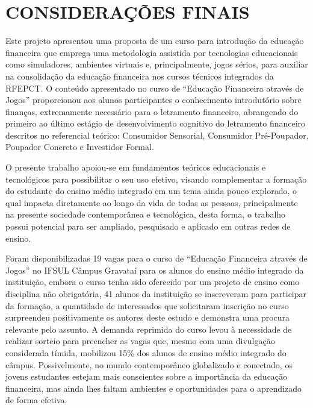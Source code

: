 \chapter{CONSIDERAÇÕES FINAIS}
Este projeto apresentou uma proposta de um curso para introdução da educação financeira que emprega uma metodologia assistida por tecnologias educacionais como simuladores, ambientes virtuais e, principalmente, jogos sérios, para auxiliar na consolidação da educação financeira nos cursos técnicos integrados da RFEPCT. O conteúdo apresentado no curso de “Educação Financeira através de Jogos” proporcionou aos alunos participantes o conhecimento introdutório sobre finanças, extremamente necessário para o letramento financeiro, abrangendo do primeiro ao último estágio de desenvolvimento cognitivo do letramento financeiro descritos no referencial teórico: Consumidor Sensorial, Consumidor Pré-Poupador, Poupador Concreto e Investidor Formal.

O presente trabalho apoiou-se em fundamentos teóricos educacionais e tecnológicos para possibilitar o seu uso efetivo, visando complementar a formação do estudante do ensino médio integrado em um tema ainda pouco explorado, o qual impacta diretamente ao longo da vida de todas as pessoas, principalmente na presente sociedade contemporânea e tecnológica, desta forma, o trabalho possui potencial para ser ampliado, pesquisado e aplicado em outras redes de ensino.

Foram disponibilizadas 19 vagas para o curso de “Educação Financeira através de Jogos” no IFSUL Câmpus Gravataí para os alunos do ensino médio integrado da instituição, embora o curso tenha sido oferecido por um projeto de ensino como disciplina não obrigatória, 41 alunos da instituição se inscreveram para participar da formação, a quantidade de interessados que solicitaram inscrição no curso surpreendeu positivamente os autores deste estudo e demonstra uma procura relevante pelo assunto. A demanda reprimida do curso levou à necessidade de realizar sorteio para preencher as vagas que, mesmo com uma divulgação considerada tímida, mobilizou 15\% dos alunos de ensino médio integrado do câmpus. Possivelmente, no mundo contemporâneo globalizado e conectado, os jovens estudantes estejam mais conscientes sobre a importância da educação financeira, mas ainda lhes faltam ambientes e oportunidades para o aprendizado de forma efetiva.

